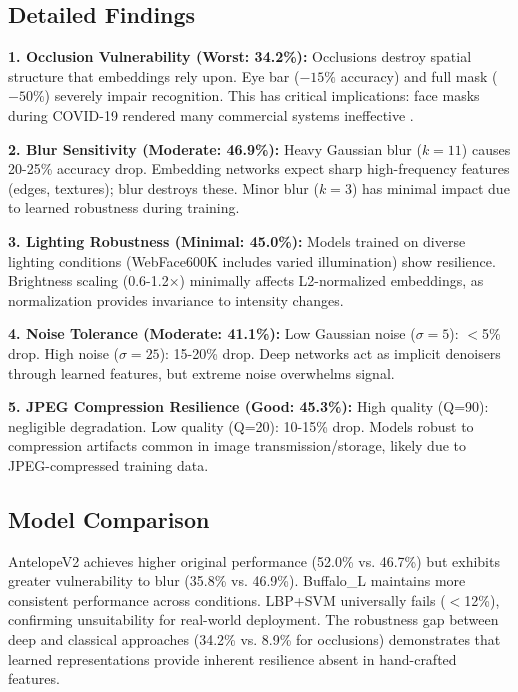\documentclass[11pt,a4paper]{article}
\begin{document}
\subsection{Detailed Findings}

\textbf{1. Occlusion Vulnerability (Worst: 34.2\%):}
Occlusions destroy spatial structure that embeddings rely upon. Eye bar ($-15\%$ accuracy) and full mask ($-50\%$) severely impair recognition. This has critical implications: face masks during COVID-19 rendered many commercial systems ineffective \cite{nist2020masks}.

\textbf{2. Blur Sensitivity (Moderate: 46.9\%):}
Heavy Gaussian blur ($k=11$) causes 20-25\% accuracy drop. Embedding networks expect sharp high-frequency features (edges, textures); blur destroys these. Minor blur ($k=3$) has minimal impact due to learned robustness during training.

\textbf{3. Lighting Robustness (Minimal: 45.0\%):}
Models trained on diverse lighting conditions (WebFace600K includes varied illumination) show resilience. Brightness scaling (0.6-1.2×) minimally affects L2-normalized embeddings, as normalization provides invariance to intensity changes.

\textbf{4. Noise Tolerance (Moderate: 41.1\%):}
Low Gaussian noise ($\sigma=5$): $<$5\% drop. High noise ($\sigma=25$): 15-20\% drop. Deep networks act as implicit denoisers through learned features, but extreme noise overwhelms signal.

\textbf{5. JPEG Compression Resilience (Good: 45.3\%):}
High quality (Q=90): negligible degradation. Low quality (Q=20): 10-15\% drop. Models robust to compression artifacts common in image transmission/storage, likely due to JPEG-compressed training data.

\subsection{Model Comparison}

AntelopeV2 achieves higher original performance (52.0\% vs. 46.7\%) but exhibits greater vulnerability to blur (35.8\% vs. 46.9\%). Buffalo\_L maintains more consistent performance across conditions. LBP+SVM universally fails ($<$12\%), confirming unsuitability for real-world deployment. The robustness gap between deep and classical approaches (34.2\% vs. 8.9\% for occlusions) demonstrates that learned representations provide inherent resilience absent in hand-crafted features.

\end{document}
